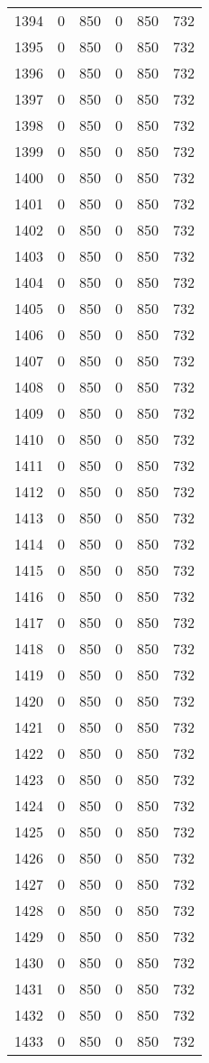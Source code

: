 \documentclass[a4paper]{ctexart}
\begin{document}
\begin{longtable}{p{1cm}|p{2cm}|p{2cm}|p{2cm}|P{2cm}|p{2cm}}
		1394&0&850&0&850&732\\
		1395&0&850&0&850&732\\
		1396&0&850&0&850&732\\
		1397&0&850&0&850&732\\
		1398&0&850&0&850&732\\
		1399&0&850&0&850&732\\
		1400&0&850&0&850&732\\
		1401&0&850&0&850&732\\
		1402&0&850&0&850&732\\
		1403&0&850&0&850&732\\
		1404&0&850&0&850&732\\
		1405&0&850&0&850&732\\
		1406&0&850&0&850&732\\
		1407&0&850&0&850&732\\
		1408&0&850&0&850&732\\
		1409&0&850&0&850&732\\
		1410&0&850&0&850&732\\
		1411&0&850&0&850&732\\
		1412&0&850&0&850&732\\
		1413&0&850&0&850&732\\
		1414&0&850&0&850&732\\
		1415&0&850&0&850&732\\
		1416&0&850&0&850&732\\
		1417&0&850&0&850&732\\
		1418&0&850&0&850&732\\
		1419&0&850&0&850&732\\
		1420&0&850&0&850&732\\
		1421&0&850&0&850&732\\
		1422&0&850&0&850&732\\
		1423&0&850&0&850&732\\
		1424&0&850&0&850&732\\
		1425&0&850&0&850&732\\
		1426&0&850&0&850&732\\
		1427&0&850&0&850&732\\
		1428&0&850&0&850&732\\
		1429&0&850&0&850&732\\
		1430&0&850&0&850&732\\
		1431&0&850&0&850&732\\
		1432&0&850&0&850&732\\
		1433&0&850&0&850&732\\

\end{longtable}
\end{document}
